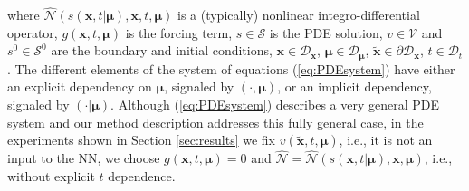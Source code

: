 where $\hat{\mathcal{N}}(s(\mathbf{x},t|\pmb{\mu}),\mathbf{x},t,\pmb{\mu})$ is a (typically) nonlinear integro-differential operator, $g(\mathbf{x}, t ,\pmb{\mu})$ is the forcing term, $s\in\mathcal{S}$ is the PDE solution, $v\in\mathcal{V}$ and $s^0\in\mathcal{S}^0$ are the boundary and initial conditions, $\mathbf{x}\in\mathcal{D}_{\mathbf{x}}$, $ \pmb{\mu}\in\mathcal{D}_{\pmb{\mu}}$, $\tilde{\mathbf{x}}\in\partial\mathcal{D}_{\mathbf{x}}$, $ t\in\mathcal{D}_{t}$. The different elements of the system of equations (\ref{eq:PDEsystem}) have either an explicit dependency on $\pmb{\mu}$, signaled by $(\cdot,\pmb{\mu})$, or an implicit dependency, signaled by $(\cdot|\pmb{\mu})$. Although (\ref{eq:PDEsystem}) describes a very general PDE system and our method description addresses this fully general case, in the experiments shown in Section \ref{sec:results} we fix $v(\tilde{\mathbf{x}},t, \pmb{\mu})$, i.e., it is not an input to the NN, we choose $g(\mathbf{x},t,\pmb{\mu} ) = 0$ and $\hat{\mathcal{N}} = \hat{\mathcal{N}}(s(\mathbf{x},t|\pmb{\mu}),\mathbf{x},\pmb{\mu})$, i.e., without explicit $t$ dependence.


